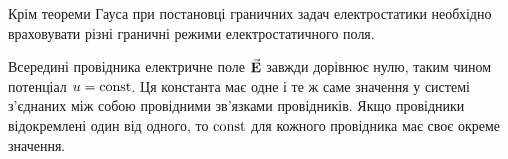 \begin{remark}
	Крім теореми Гауса при постановці граничних задач електростатики необхідно враховувати різні граничні режими електростатичного поля.
\end{remark}

\begin{example}
	Всередині провідника електричне поле ${\vec{\mathbf{E}}}$ завжди дорівнює нулю, таким чином потенціал $u = \operatorname{const}$. Ця константа має одне і те ж саме значення у системі з'єднаних між собою провідними зв'язками провідників. Якщо провідники відокремлені один від одного, то $\operatorname{const}$ для кожного провідника має своє окреме значення.
\end{example}


